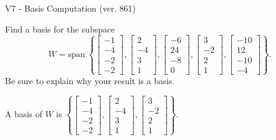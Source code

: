 \begin{exercise}
  \begin{exerciseTitle}V7 - Basis Computation (ver. 861)\end{exerciseTitle}
  \begin{exerciseStatement}
    Find a basis for the subspace 
\[W=\mathrm{span}\ \left\{\left[\begin{array}{r}
-1 \\
-4 \\
-2 \\
-2
\end{array}\right] , \left[\begin{array}{r}
2 \\
-4 \\
3 \\
1
\end{array}\right] , \left[\begin{array}{r}
-6 \\
24 \\
-8 \\
0
\end{array}\right] , \left[\begin{array}{r}
3 \\
-2 \\
2 \\
1
\end{array}\right] , \left[\begin{array}{r}
-10 \\
12 \\
-10 \\
-4
\end{array}\right]\right\}.\]
 Be sure to explain why your result is a basis.


  \end{exerciseStatement}
  \begin{exerciseAnswer}
   A basis of \(W\) is  \(\left\{\left[\begin{array}{r}
-1 \\
-4 \\
-2 \\
-2
\end{array}\right] , \left[\begin{array}{r}
2 \\
-4 \\
3 \\
1
\end{array}\right] , \left[\begin{array}{r}
3 \\
-2 \\
2 \\
1
\end{array}\right]\right\}\).
  


  \end{exerciseAnswer}
\end{exercise}